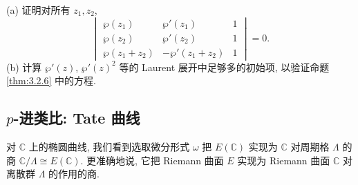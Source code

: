 \begin{exercise} \label{thm:3.3.23} 
(a) 证明对所有 $z_1, z_2$,
\[
\begin{vmatrix}
\wp(z_1) & \wp'(z_1) & 1\\
\wp(z_2) & \wp'(z_2) & 1\\
\wp(z_1+z_2) & -\wp'(z_1+z_2) & 1
\end{vmatrix} = 0.
\]
(b) 计算 $\wp'(z)$, $\wp'(z)^2$ 等的 Laurent 展开中足够多的初始项, 以验证命题 \ref{thm:3.2.6} 中的方程.
\end{exercise}

\subsection*{$p$-进类比: Tate 曲线}\label{subsec:tate-curves}

对 $\mathbb{C}$ 上的椭圆曲线, 我们看到选取微分形式 $\omega$ 把 $E(\mathbb{C})$ 实现为 $\mathbb{C}$ 对周期格 $\Lambda$ 的商 $\mathbb{C}/\Lambda\cong E(\mathbb{C})$. 更准确地说, 它把 Riemann 曲面 $E$ 实现为 Riemann 曲面 $\mathbb{C}$ 对离散群 $\Lambda$ 的作用的商.

